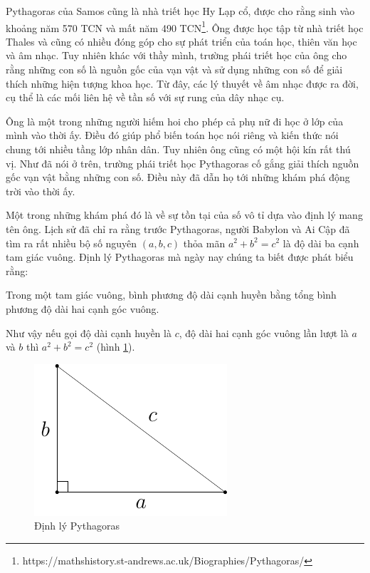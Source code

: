 Pythagoras của Samos cũng là nhà triết học Hy Lạp cổ, được cho rằng sinh vào khoảng năm 570 TCN và mất năm  490 TCN\footnote{https://mathshistory.st-andrews.ac.uk/Biographies/Pythagoras/}. Ông được học tập từ nhà triết học Thales và cũng có nhiều đóng góp cho sự phát triển của toán học, thiên văn học và âm nhạc. Tuy nhiên khác với thầy mình, trường phái triết học của ông cho rằng những con số là nguồn gốc của vạn vật và sử dụng những con số để giải thích những hiện tượng khoa học. Từ đây, các lý thuyết về âm nhạc được ra đời, cụ thể là các mối liên hệ về tần số với sự rung của dây nhạc cụ.

Ông là một trong những người hiếm hoi cho phép cả phụ nữ đi học ở lớp của mình vào thời ấy. Điều đó giúp phổ biến toán học nói riêng và kiến thức nói chung tới nhiều tầng lớp nhân dân. Tuy nhiên ông cũng có một hội kín rất thú vị. Như đã nói ở trên, trường phái triết học Pythagoras cố gắng giải thích nguồn gốc vạn vật bằng những con số. Điều này đã dẫn họ tới những khám phá động trời vào thời ấy.

Một trong những khám phá đó là về sự tồn tại của số vô tỉ dựa vào định lý mang tên ông. Lịch sử đã chỉ ra rằng trước Pythagoras, người Babylon và Ai Cập đã tìm ra rất nhiều bộ số nguyên $(a, b, c)$ thỏa mãn $a^2 + b^2 = c^2$ là độ dài ba cạnh tam giác vuông. Định lý Pythagoras mà ngày nay chúng ta biết được phát biểu rằng:

\begin{theorem}
    Trong một tam giác vuông, bình phương độ dài cạnh huyền bằng tổng bình phương độ dài hai cạnh góc vuông.
\end{theorem}

Như vậy nếu gọi độ dài cạnh huyền là $c$, độ dài hai cạnh góc vuông lần lượt là $a$ và $b$ thì $a^2 + b^2 = c^2$ (hình \ref{pythagoras1}).

\begin{figure}[ht]
	\centering
	\includegraphics{analytic_geometry/pythagoras1.pdf}
	\caption{Định lý Pythagoras}
	\label{pythagoras1}
\end{figure}

